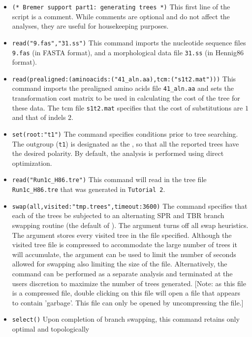 \begin{itemize}
\item \texttt{(* Bremer support part1: generating trees *)} This first line of the script is a comment. While comments
 are optional and do not affect the analyses, they are useful for housekeeping purposes. 
\item \texttt{read("9.fas","31.ss")} This command imports the nucleotide sequence files \texttt{9.fas} (in FASTA 
format), and a morphological data file \texttt{31.ss} (in Hennig86 format).
\item \texttt{read(prealigned:(aminoacids:("41\_aln.aa),tcm:("s1t2.mat")))} This command imports the prealigned
amino acids file \texttt{41\_aln.aa} and sets the transformation cost matrix to be used in calculating the cost of the tree
for these data.  The tcm file \texttt{s1t2.mat} specifies that the cost of substitutions are $1$ and that of indels $2$.
\item \texttt{set(root:"t1")} The  command specifies 
conditions prior to tree searching. The outgroup (\texttt{t1}) is designated as the , so that all the 
reported trees have the desired polarity. By default, the analysis is performed using direct optimization.
\item \texttt{read("Run1c\_H86.tre")} This command will read in the tree file \texttt{Run1c\_H86.tre} that was 
generated in \texttt{Tutorial 2}.
\item \texttt{swap(all,visited:"tmp.trees",timeout:3600)} The  command specifies that each of 
the trees be subjected to an alternating SPR and TBR branch swapping routine (the default of \poy).  The 
 argument turns off all swap heuristics. The  argument stores 
every visited tree in the file specified.  Although the visited tree file is compressed to accommodate the large 
number of trees it will accumulate, the argument  can be used to limit the number of 
seconds allowed for swapping also limiting the size of the file.  Alternatively,  the   command 
can be performed as a separate analysis and terminated at the users discretion to maximize the number of trees 
generated. [Note: as this  file is a compressed file, double clicking on this file will open 
a file that appears to contain 'garbage'.  This file can only be opened by uncompressing the file.]
\item \texttt{select()} Upon completion of branch swapping, this command retains only optimal and topologically

\end{itemize}

